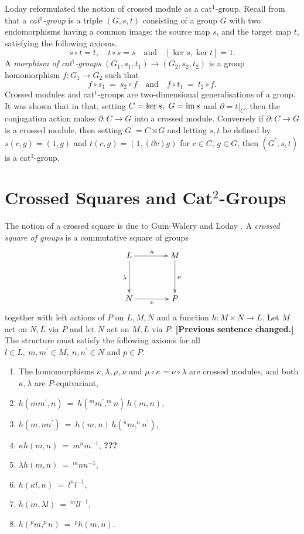 \documentclass[a4paper,11pt]{article}
\theoremstyle{plain}
\theoremstyle{definition}
\begin{document}
Loday reformulated the notion of crossed module as a cat$^{1}$-group. 
Recall from \cite{Loday} that a \emph{cat$^{1}$-group} is a triple $(G,s,t)$ consisting of a group $G$ with two endomorphisms having a common image: 
the source map $s$, and the target map $t$, satisfying the following axioms. 
$$
s \circ t = t,\quad 
t \circ s = s \quad \mbox{and}\quad 
[\ker s,\ker t] = 1. 
$$
A \emph{morphism of cat}$^{1}$\emph{-groups} 
$(G_{1},s_1,t_1) \rightarrow (G_{2},s_2,t_2)$ 
is a group homomorphism $f : G_{1} \rightarrow G_{2}$ such that 
$$
f \circ s_1 ~=~ s_2 \circ f  
\quad\mbox{and}\quad 
f \circ t_1 ~=~ t_2 \circ f.
$$
Crossed modules and cat$^{1}$-groups are two-dimensional generalisations 
of a group. 
It was shown that in \cite[Lemma 2.2]{Loday} that, 
setting $C = \ker s,~ G = \mathrm{im}\, s$ and $\partial =t|_{C}$, 
then the conjugation action makes $\partial :C\rightarrow G$ into a crossed module. Conversely if $\partial : C \rightarrow G$ is a crossed module, 
then setting $G^{\prime} = C\rtimes G$
and letting $s,t$ be defined by $s(c,g) = (1,g)$ and $t(c,g) = (1,(\partial c)g)$
for $c\in C$, $g\in G$, then $(G^{\prime},s,t)$ is a cat$^{1}$-group.


\section{Crossed Squares and Cat$^{2}$-Groups}

The notion of a crossed square is due to Guin-Walery and Loday \cite{walery}. 
A \emph{crossed square of groups} is a commutative square of groups 
\[
\xymatrix@R=40pt@C=40pt
{ L \ar[d]_{\lambda} \ar[r]^{\kappa} 
	& M \ar[d]^{\mu} \\ 
	N \ar[r]_{\nu} 
	& P } 
\]
\noindent together with left actions of $P$ on $L,M,N$ 
and a function $h : M\times N\rightarrow L$. 
Let $M$ act on $N,L$ via $P$ and let $N$ act on $M,L$ via $P$. 
{\bf [Previous sentence changed.]}  
The structure must satisfy the following axioms 
for all $l \in L,~ m,m^{\prime} \in M,~ n,n^{\prime} \in N$ and $p \in P$. 

\begin{enumerate}
	\item 
	The homomorphisms $\kappa, \lambda, \mu, \nu$ 
	and $\mu\circ\kappa = \nu\circ\lambda$ are crossed modules, 
	and both $\kappa, \lambda$ are $P$-equivariant, 
	\item
	$h(mm^{\prime},n) ~=~ h(^{m}m^{\prime},^{m}n)\,h(m,n)$, 
	\item
	$h(m,nn^{\prime}) ~=~ h(m,n)\,h(^{n}m,^{n}n^{\prime})$, 
	\item 
	$\kappa h(m,n) ~=~ m^{n}m^{-1}$, {\bf ???}
	\item 
	$\lambda h(m,n) ~=~ ^{m}nn^{-1}$, 
	\item 
	$h(\kappa l,n) ~=~ l^{n}l^{-1}$, 
	\item
	$h(m,\lambda l) ~=~ ^{m}ll^{-1}$, 
	\item 
	$h(^{p}m,^{p}n) ~=~ ^{p}h(m,n)$. 
\end{enumerate} 
\end{document}
